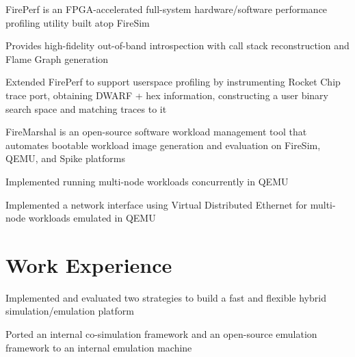 \documentclass[]{deedy-resume-openfont}
\begin{document}

\begin{tightemize}
{\normalsize
\item FirePerf is an FPGA-accelerated full-system hardware/software performance profiling utility built atop FireSim
\item Provides high-fidelity out-of-band introspection with call stack reconstruction and Flame Graph generation
\item Extended FirePerf to support userspace profiling by instrumenting Rocket Chip trace port, obtaining DWARF + hex information, constructing a user binary search space and matching traces to it
}
\end{tightemize}

\begin{tightemize}
{\normalsize
\item FireMarshal is an open-source software workload management tool that automates bootable workload image generation and evaluation on FireSim, QEMU, and Spike platforms
\item Implemented running multi-node workloads concurrently in QEMU
\item Implemented a network interface using Virtual Distributed Ethernet for multi-node workloads emulated in QEMU
}
\end{tightemize}


\sectionsep

\section{Work Experience}

\vspace{\topsep}
\vspace{\topsep} %
{\normalsize
\begin{tightemize}
\item Implemented and evaluated two strategies to build a fast and flexible hybrid simulation/emulation platform
\item Ported an internal co-simulation framework and an open-source emulation framework to an internal emulation machine
\end{tightemize}
}
\end{document}
